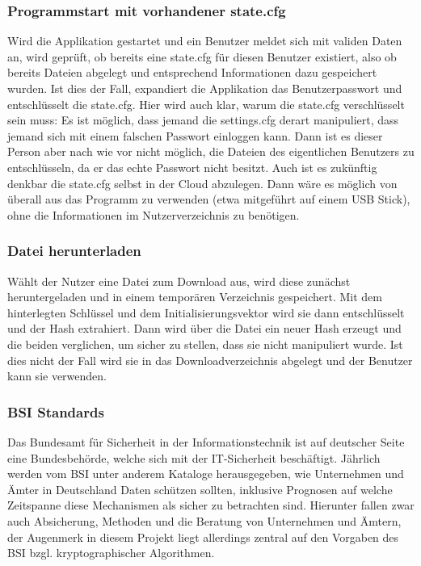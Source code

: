 \documentclass[13pt,a4paper,bibliography=totocnumbered,listof=totocnumbered]{scrartcl}
\begin{document}
\subsubsection{Programmstart mit vorhandener state.cfg}
Wird die Applikation gestartet und ein Benutzer meldet sich mit validen Daten an, wird geprüft, ob bereits eine state.cfg für diesen Benutzer existiert, also ob bereits Dateien abgelegt und entsprechend Informationen dazu gespeichert wurden. Ist dies der Fall, expandiert die Applikation das Benutzerpasswort und entschlüsselt die state.cfg. Hier wird auch klar, warum die state.cfg verschlüsselt sein muss: Es ist möglich, dass jemand die settings.cfg derart manipuliert, dass jemand sich mit einem falschen Passwort einloggen kann. Dann ist es dieser Person aber nach wie vor nicht möglich, die Dateien des eigentlichen Benutzers zu entschlüsseln, da er das echte Passwort nicht besitzt. Auch ist es zukünftig denkbar die state.cfg selbst in der Cloud abzulegen. Dann wäre es möglich von überall aus das Programm zu verwenden (etwa mitgeführt auf einem USB Stick), ohne die Informationen im Nutzerverzeichnis zu benötigen.
\subsubsection{Datei herunterladen}
Wählt der Nutzer eine Datei zum Download aus, wird diese zunächst heruntergeladen und in einem temporären Verzeichnis gespeichert. Mit dem hinterlegten Schlüssel und dem Initialisierungsvektor wird sie dann entschlüsselt und der Hash extrahiert. Dann wird über die Datei ein neuer Hash erzeugt und die beiden verglichen, um sicher zu stellen, dass sie nicht manipuliert wurde. Ist dies nicht der Fall wird sie in das Downloadverzeichnis abgelegt und der Benutzer kann sie verwenden.
\subsubsection{BSI Standards}
Das Bundesamt für Sicherheit in der Informationstechnik ist auf deutscher Seite eine Bundesbehörde, welche sich mit der IT-Sicherheit beschäftigt. Jährlich werden vom BSI unter anderem Kataloge herausgegeben, wie Unternehmen und Ämter in Deutschland Daten schützen sollten, inklusive Prognosen auf welche Zeitspanne diese Mechanismen als sicher zu betrachten sind. Hierunter fallen zwar auch Absicherung, Methoden und die  Beratung von Unternehmen und Ämtern, der Augenmerk in diesem Projekt liegt allerdings zentral auf den Vorgaben des BSI bzgl. kryptographischer Algorithmen.
\end{document}
